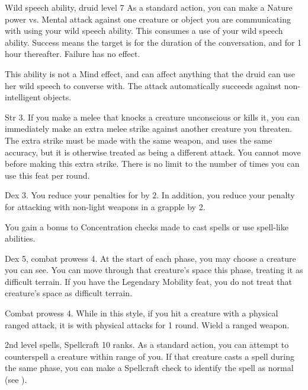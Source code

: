 \featpre Wild speech ability, druid level 7
\featben  As a standard action, you can make a Nature power vs. Mental attack against one creature or object you are communicating with using your wild speech ability.
This consumes a use of your wild speech ability.
Success means the target is \charmed for the duration of the conversation, and for 1 hour thereafter.
Failure has no effect.

This ability is not a Mind effect, and can affect anything that the druid can use her wild speech to converse with.
The attack automatically succeeds against non-intelligent objects.

\featpre Str 3.
\featben If you make a melee  that knocks a creature unconscious or kills it, you can immediately make an extra melee strike against another creature you threaten.
The extra strike must be made with the same weapon, and uses the same accuracy, but it is otherwise treated as being a different attack.
You cannot move before making this extra strike.
There is no limit to the number of times you can use this feat per round.

\featpre Dex 3.
\featben You reduce your penalties for  by 2. In addition, you reduce your penalty for attacking with non-light weapons in a grapple by 2.

\featben You gain a  bonus to Concentration checks made to cast spells or use spell-like abilities.

\featpre Dex 5, combat prowess 4.
\featben At the start of each phase, you may choose a creature you can see.
You can move through that creature's space this phase, treating it as difficult terrain.
 If you have the Legendary Mobility feat, you do not treat that creature's space as difficult terrain.

\featpres Combat prowess 4.
\featben While in this style, if you hit a creature with a physical ranged attack, it is \impaired with physical attacks for 1 round.
\stylereq Wield a ranged weapon.

\featpres 2nd level spells, Spellcraft 10 ranks.
\featben As a standard action, you can attempt to counterspell a creature within \rngmed range of you.
If that creature casts a spell during the same phase, you can make a Spellcraft check to identify the spell as normal (see ).


